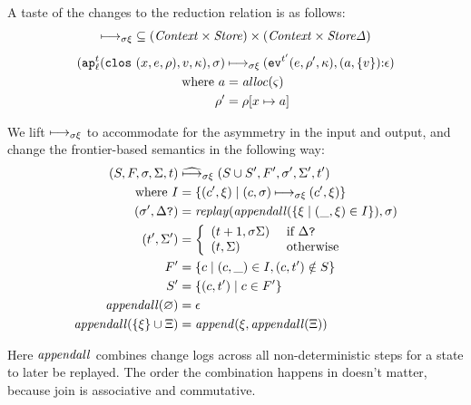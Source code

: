 \documentclass[preprint,onecolumn,9pt]{sigplanconf} %
\begin{document}
A taste of the changes to the reduction relation is as follows:
\begin{equation*}
\dmachstep \subseteq (\Context\times\Store) \times (\Context\times\StoreDelta) 
\end{equation*}
\begin{align*}
\ttuple{\ap[^\mcntr_\mlab]{\clos{\mvar,\mexp,\menv},\mval,\mkont}}{\msto} & \dmachstep
\ttuple{\ev[^{\mcntr'}]{\mexp,\menv',\mkont}}{\cons{\ttuple{\maddr}{\setof{\mval}}}{\epsilon}} \\
\text{ where }\maddr &= \alloc(\mstate) \\
              \menv' &= \menv[\mvar\mapsto\maddr]
\end{align*}


We lift $\dmachstep$ to accommodate for the asymmetry
in the input and output, and change the frontier-based semantics in
the following way:
{\small
\begin{align*}
(S, F, \msto,\Sigma,t) &\mathrel{\damachstep} (S \cup S', F', \msto',\Sigma',t') \\
\mbox{ where }
 I &= \setof{(c',\msdiff) \mid \ttuple{c}{\msto} \dmachstep \ttuple{c'}{\msdiff} } \\
 \ttuple{\msto'}{\changep} &= \replay(\appendall(\setof{\msdiff \mid (\_,\msdiff) \in I}),\msto) \\
 \ttuple{t'}{\Sigma'} &=
     \left\{
       \begin{array}{ll}
         \ttuple{t+1}{\msto\Sigma} & \text{ if } \changep \\
         \ttuple{t}{\Sigma} & \text{ otherwise}
       \end{array}\right. \\
 F' &= \setof{c \mid (c,\_) \in I, (c,t') \notin S} \\
 S' &= \setof{(c,t') \mid c \in F'} \\
\appendall(\varnothing) &= \epsilon \\
\appendall(\setof{\msdiff}\cup\Xi) &= \append(\msdiff,\appendall(\Xi))
\end{align*}}

Here $\appendall$ combines change logs across all non-deterministic
steps for a state to later be replayed. The order the combination
happens in doesn't matter, because join is associative and
commutative.
\end{document}
